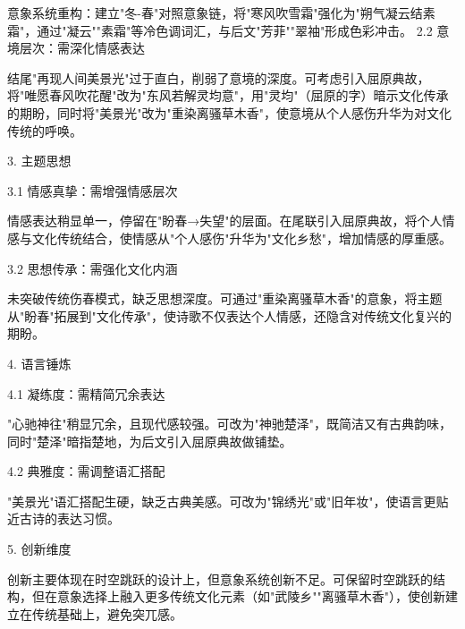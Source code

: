 \begin{tcolorbox}[
    breakable,            %
    colback=white, %
    colframe=black, 
    boxrule=1pt,        %
    arc=0mm             %
    ]
    \hspace{2em}意象系统重构：建立"冬-春"对照意象链，将"寒风吹雪霜"强化为"朔气凝云结素霜"，通过"凝云""素霜"等冷色调词汇，与后文"芳菲""翠袖"形成色彩冲击。
    \hspace{2em}2.2 意境层次：需深化情感表达\par
    \hspace{2em}结尾"再现人间美景光"过于直白，削弱了意境的深度。可考虑引入屈原典故，将"唯愿春风吹花醒"改为"东风若解灵均意"，用"灵均"（屈原的字）暗示文化传承的期盼，同时将"美景光"改为"重染离骚草木香"，使意境从个人感伤升华为对文化传统的呼唤。\par
    3. 主题思想\par
    \hspace{2em}3.1 情感真挚：需增强情感层次\par
        情感表达稍显单一，停留在"盼春→失望"的层面。在尾联引入屈原典故，将个人情感与文化传统结合，使情感从"个人感伤"升华为"文化乡愁"，增加情感的厚重感。\par
        \hspace{2em}3.2 思想传承：需强化文化内涵\par
        \hspace{2em}未突破传统伤春模式，缺乏思想深度。可通过"重染离骚草木香"的意象，将主题从"盼春"拓展到"文化传承"，使诗歌不仅表达个人情感，还隐含对传统文化复兴的期盼。\par
    4. 语言锤炼\par
    \hspace{2em}4.1 凝练度：需精简冗余表达\par
    \hspace{2em}"心驰神往"稍显冗余，且现代感较强。可改为"神驰楚泽"，既简洁又有古典韵味，同时"楚泽"暗指楚地，为后文引入屈原典故做铺垫。\par
    \hspace{2em}4.2 典雅度：需调整语汇搭配\par
    \hspace{2em}"美景光"语汇搭配生硬，缺乏古典美感。可改为"锦绣光"或"旧年妆"，使语言更贴近古诗的表达习惯。\par
    5. 创新维度\par
    \hspace{2em}创新主要体现在时空跳跃的设计上，但意象系统创新不足。可保留时空跳跃的结构，但在意象选择上融入更多传统文化元素（如"武陵乡""离骚草木香"），使创新建立在传统基础上，避免突兀感。\par
\end{tcolorbox}

